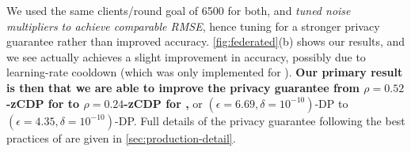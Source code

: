 \documentclass{article}
\begin{document}
We used the same clients/round goal of 6500 for both, and \emph{tuned noise multipliers to achieve comparable RMSE}, hence tuning for a stronger privacy guarantee rather than improved accuracy. \cref{fig:federated}(b) shows our results, and we see \BANDMF actually achieves a slight improvement in accuracy, possibly due to learning-rate cooldown (which was only implemented for \BANDMF). 
\textbf{Our primary result is then that we are able to improve the privacy guarantee from $\rho{=}0.52$-zCDP for \onlinetreeagg to $\rho{=}0.24$-zCDP for \BANDMF,} or $(\epsilon{=}6.69, \delta{=}10^{-10})$-DP to $(\epsilon{=}4.35, \delta{=}10^{-10})$-DP. Full details of the privacy guarantee following the best practices of \citet{ponomareva2023dpfy} are given in \cref{sec:production-detail}.





\end{document}
